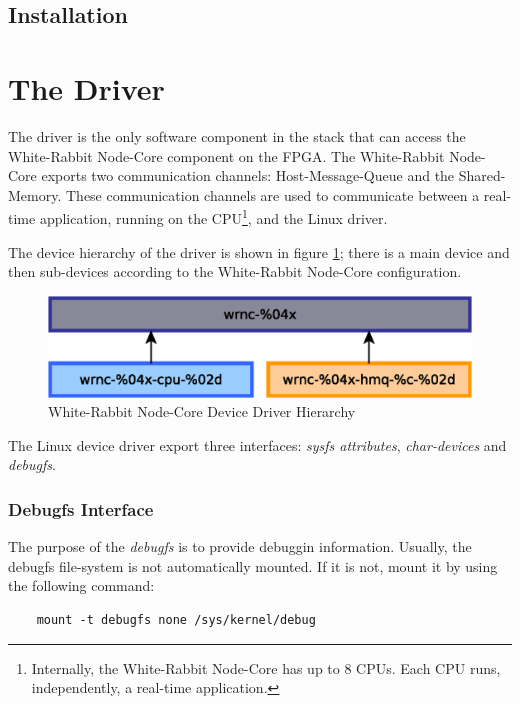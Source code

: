 \documentclass[a4paper,10pt]{article}
\begin{document}
\subsection{Installation}

\section{The Driver}%
The driver is the only software component in the stack that can access
the White-Rabbit Node-Core component on the FPGA. The White-Rabbit
Node-Core exports two communication channels: Host-Message-Queue and
the Shared-Memory. These communication channels are used to 
communicate between a real-time application, running on the
CPU\footnote{Internally, the White-Rabbit Node-Core has up to 8 CPUs.
Each CPU runs, independently, a real-time application.}, and the Linux
driver.

The device hierarchy of the driver is shown in figure 
\ref{fig:swdrvhier}; there is a main device and then sub-devices 
according to the White-Rabbit Node-Core configuration.

\begin{figure}[ht]
	\centering
	\includegraphics[scale=0.5]{img/sw-drv-hier.eps}
	\caption{White-Rabbit Node-Core Device Driver Hierarchy}
        \label{fig:swdrvhier}
\end{figure}

The Linux device driver export three interfaces: \textit{sysfs attributes},
\textit{char-devices} and \textit{debugfs}.

\subsubsection{Debugfs Interface}
The purpose of the \textit{debugfs} is to provide debuggin information.
Usually, the debugfs file-system is not automatically mounted. If it
is not, mount it by using the following command:

\begin{verbatim}
    mount -t debugfs none /sys/kernel/debug
\end{verbatim}
\end{document}
